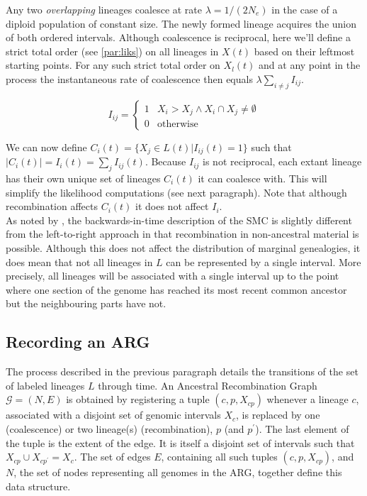 \documentclass{article}
\begin{document}
Any two \emph{overlapping} lineages coalesce at rate $\lambda = 1/(2N_e)$ in the case
of a diploid population of constant size. The newly formed lineage acquires the 
union of both ordered intervals.
Although coalescence is reciprocal, here we'll define a strict total order 
(see \ref{par:liks}) on 
all lineages in $X(t)$ based on their leftmost starting points. 
For any such strict total order on $X_l(t)$ and at any point in the process 
the instantaneous rate of coalescence then equals $\lambda \sum_{i \neq j} I_{ij}$.

\begin{equation} \label{def:coal}
I_{ij} = \begin{cases}
1 & X_i > X_j \wedge X_i \cap X_j \neq \emptyset \\
0 & \text{otherwise}
\end{cases}
\end{equation}

We can now define $C_i(t) = \{X_j \in L(t) | I_{ij}(t) = 1\}$ such that $|C_i(t)| = 
I_{i}(t) = \sum_{j} I_{ij}(t)$.
Because $I_{ij}$ is not reciprocal, each extant lineage has their own unique set of 
lineages $C_i(t)$ it can coalesce with. This will simplify the likelihood computations 
(see next paragraph). Note that although recombination affects $C_i(t)$ it does not 
affect $I_{i}$.\\ 

As noted by \cite{mcvean_approximating_2005}, the backwards-in-time description of the 
SMC is slightly different from the left-to-right approach in that recombination 
in non-ancestral material is possible. Although this does not affect the distribution 
of marginal genealogies, it does mean that not all lineages in $L$ can be represented 
by a single interval. More precisely, all lineages will be associated with 
a single interval up to the point where one section of the 
genome has reached its most recent common ancestor but the neighbouring parts have not.

\subsection{Recording an ARG} \label{par:recording}

The process described in the previous paragraph details the transitions of the 
set of labeled lineages $L$ through time. An Ancestral Recombination Graph 
$\mathcal{G} = (N, E)$ is obtained by registering a tuple $(c, p, X_{cp})$ whenever a 
lineage $c$, associated with a disjoint set of genomic intervals $X_c$, is 
replaced by one (coalescence) or two lineage(s) (recombination), $p$ (and $p^{\prime}$).
The last element of the tuple is the extent of the edge. It is itself a  
disjoint set of intervals such that $X_{cp} \cup X_{cp^{\prime}} = X_c$. 
The set of edges $E$, containing all such tuples $(c, p, X_{cp})$, 
and $N$, the set of nodes representing all genomes in the ARG, together
define this data structure.\\
\end{document}

